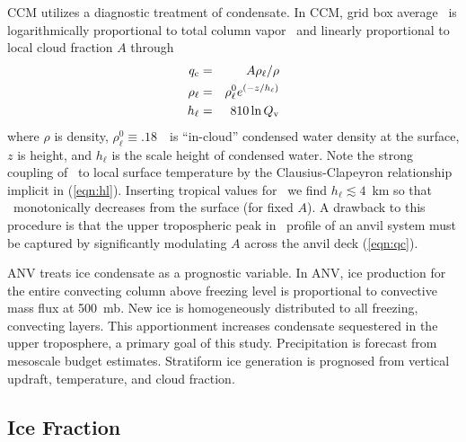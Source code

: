 \documentclass[agums]{aguplus}
\begin{document}
CCM utilizes a diagnostic treatment of condensate.
In CCM, grid box average \qc\ is logarithmically proportional to
total column  vapor \Qv\ and linearly proportional to local cloud
fraction $A$ through
\begin{eqnarray}
\label{eqn:qc}
\qc & = & A \rho_\ell / \rho \\
\label{eqn:rhol}
\rho_\ell & = & \rho_\ell^0 e^{(-z/h_\ell)} \\
\label{eqn:hl}
h_\ell & = & 810 \ln \Qv
\end{eqnarray}
where $\rho$ is density, $\rho_\ell^0 \equiv .18$~\gxmC\
is ``in-cloud'' condensed water density at the surface, $z$ is height,
and $h_\ell$ is the scale height of condensed water.
Note the strong coupling of \qc\ to local surface temperature by the
Clausius-Clapeyron relationship implicit in (\ref{eqn:hl}).
Inserting tropical values for \Qv\ we find $h_\ell \lesssim 4$~km so
that \qc\ monotonically decreases from the surface (for fixed $A$).
A drawback to this procedure is that the upper tropospheric peak in
\qc\ profile of an anvil system \cite[e.g., Figure~3 of][]{ZeK961}
must be captured by significantly modulating $A$ across the anvil deck
(\ref{eqn:qc}).  

ANV treats ice condensate as a prognostic variable.
In ANV, ice production for the entire convecting column above freezing
level is proportional to convective mass flux at 500~mb.
New ice is homogeneously distributed to all freezing, convecting
layers. 
This apportionment increases condensate sequestered in the upper
troposphere, a primary goal of this study.  
Precipitation is forecast from mesoscale budget estimates.
Stratiform ice generation is prognosed from vertical updraft,
temperature, and cloud fraction.  

\subsection{Ice Fraction}\label{sec:fice}
\end{document}
